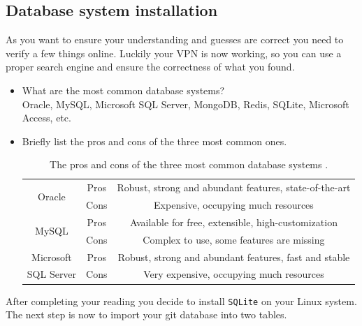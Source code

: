 \documentclass[a4paper]{article}
\begin{document}
\subsection{Database system installation}
As you want to ensure your understanding and guesses are correct you need to verify a few things online. Luckily your VPN is now working, so you can use a proper search engine and ensure the correctness of what you found.
\begin{itemize}
    \item What are the most common database systems?\\
    Oracle, MySQL, Microsoft SQL Server, MongoDB, Redis, SQLite, Microsoft Access, etc.
    \item Briefly list the pros and cons of the three most common ones.\\
    \begin{table}[H]
        \centering
        \begin{tabular}{|c|c|c|}
            \hline
            \multirow{2}{*}{Oracle}&Pros&Robust, strong and abundant features, state-of-the-art\\
            \cline{2-3}
            &Cons&Expensive, occupying much resources\\
            \hline
            \multirow{2}{*}{MySQL}&Pros&Available for free, extensible, high-customization\\
            \cline{2-3}
            &Cons&Complex to use, some features are missing\\
            \hline
            Microsoft&Pros&Robust, strong and abundant features, fast and stable\\
            \cline{2-3}
            SQL Server&Cons&Very expensive, occupying much resources\\
            \hline
        \end{tabular}
        \caption{The pros and cons of the three most common database systems \cite{dbsys}.}
    \end{table}
\end{itemize}
After completing your reading you decide to install \texttt{SQLite} on your Linux system. The next step is now to import your git database into two tables.
\end{document}
